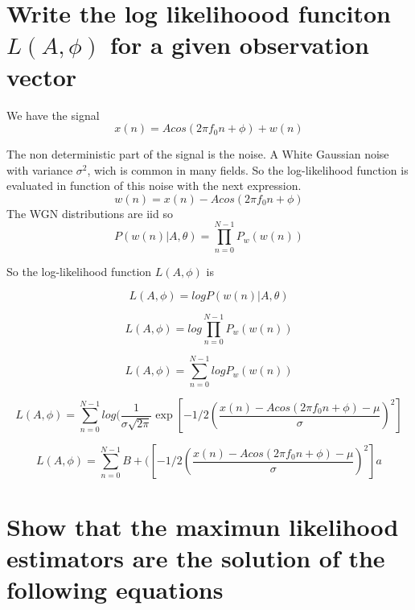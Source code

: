 \documentclass{report}
\begin{document}
\section{Write the log likelihoood funciton $L(A,\phi)$ for a given observation vector}
\label{estimationProblem}

We have the signal 
\begin{equation}\label{key}
x(n) = A cos (2\pi f_0 n + \phi) + w(n)
\end{equation}

The non deterministic part of the signal is the noise. A White Gaussian noise with variance $\sigma ^2$, wich is common in many fields. So the log-likelihood function is evaluated in function of this noise with the next expression.
\begin{equation}\label{key}
w(n) = x(n) - A cos (2\pi f_0 n + \phi)
\end{equation}
The WGN distributions are iid so 
\begin{equation}\label{key}
P(w(n)|A,\theta ) = \prod_{n=0}^{N-1} P_w(w(n))
\end{equation}

So the log-likelihood function $L(A,\phi)$ is 

\begin{equation}\label{key}
L(A,\phi) = log P(w(n)|A,\theta )
\end{equation}

\begin{equation}\label{key}
L(A,\phi) = log \prod_{n=0}^{N-1} P_w(w(n))
\end{equation}

\begin{equation}\label{key}
L(A,\phi) = \sum_{n=0}^{N-1} log P_w(w(n))
\end{equation}

\begin{equation}\label{key}
L(A,\phi) = \sum_{n=0}^{N-1} log(\frac{1}{\sigma \sqrt{2\pi}}\exp{[-1/2(\frac{x(n) - A cos (2\pi f_0 n + \phi)-\mu}{\sigma})^2]}
\end{equation}

\begin{equation}\label{key}
L(A,\phi) = \sum_{n=0}^{N-1} B + ({[-1/2(\frac{x(n) - A cos (2\pi f_0 n + \phi)-\mu}{\sigma})^2]}a
\end{equation}

\section{Show that the maximun likelihood estimators are the solution of the following equations}
\end{document}
